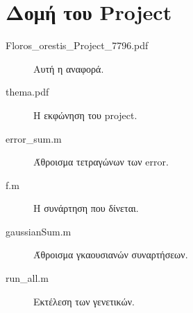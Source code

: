 \chapter*{Δομή του Project} \label{project-structure}

\begin{description}
	\item[Floros\_orestis\_Project\_7796.pdf] Αυτή η αναφορά.
	\item[thema.pdf] Η εκφώνηση του project.
	\item[error\_sum.m] Άθροισμα τετραγώνων των error.
	\item[f.m] Η συνάρτηση που δίνεται.
	\item[gaussianSum.m] Άθροισμα γκαουσιανών συναρτήσεων.
	\item[run\_all.m] Εκτέλεση των γενετικών.
\end{description}






